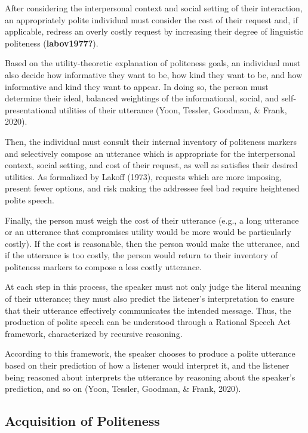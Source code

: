 \documentclass[
  english,
  man,floatsintext]{apa6}
\begin{document}
After considering the interpersonal context and social setting of their interaction, an appropriately polite individual must consider the cost of their request and, if applicable, redress an overly costly request by increasing their degree of linguistic politeness (\textbf{labov1977?}).

Based on the utility-theoretic explanation of politeness goals, an individual must also decide how informative they want to be, how kind they want to be, and how informative and kind they want to appear. In doing so, the person must determine their ideal, balanced weightings of the informational, social, and self- presentational utilities of their utterance (Yoon, Tessler, Goodman, \& Frank, 2020).

Then, the individual must consult their internal inventory of politeness markers and selectively compose an utterance which is appropriate for the interpersonal context, social setting, and cost of their request, as well as satisfies their desired utilities. As formalized by Lakoff (1973), requests which are more imposing, present fewer options, and risk making the addressee feel bad require heightened polite speech.

Finally, the person must weigh the cost of their utterance (e.g., a long utterance or an utterance that compromises utility would be more would be particularly costly). If the cost is reasonable, then the person would make the utterance, and if the utterance is too costly, the person would return to their inventory of politeness markers to compose a less costly utterance.

At each step in this process, the speaker must not only judge the literal meaning of their utterance; they must also predict the listener's interpretation to ensure that their utterance effectively communicates the intended message. Thus, the production of polite speech can be understood through a Rational Speech Act framework, characterized by recursive reasoning.

According to this framework, the speaker chooses to produce a polite utterance based on their prediction of how a listener would interpret it, and the listener being reasoned about interprets the utterance by reasoning about the speaker's prediction, and so on (Yoon, Tessler, Goodman, \& Frank, 2020).

\hypertarget{acquisition-of-politeness}{%
\subsection{Acquisition of Politeness}\label{acquisition-of-politeness}}
\end{document}
